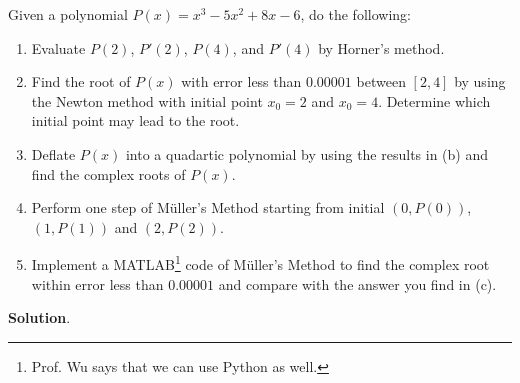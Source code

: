 \documentclass[11pt]{article}
\theoremstyle{break}
\numberwithin{equation}{theorem}
\begin{document}
\newpage
\begin{problem}\label{problem 11}
    Given a polynomial $P(x) = x^3-5x^2+8x-6$, do the following:
    \begin{enumerate}
        \item Evaluate $P(2)$, $P'(2)$, $P(4)$, and $P'(4)$ by Horner's method.
        \item Find the root of $P(x)$ with error less than $0.00001$ between $[2, 4]$ by using the Newton method with initial point $x_0 = 2$ and $x_0 = 4$. Determine which initial point may lead to the root.
        \item Deflate $P(x)$ into a quadartic polynomial by using the results in (b) and find the complex roots of $P(x)$.
        \item Perform one step of Müller's Method starting from initial $(0,P(0))$, $(1,P(1))$ and $(2,P(2))$.
        \item Implement a MATLAB\footnote{Prof. Wu says that we can use Python as well.} code of Müller's Method to find the complex root within error less than $0.00001$ and compare with the answer you find in (c).
    \end{enumerate}
\end{problem}
\textbf{Solution}.
\end{document}
